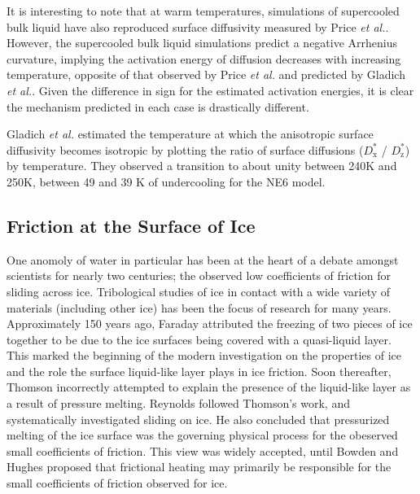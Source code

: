 It is interesting to note that at warm temperatures, simulations of
supercooled bulk liquid\cite{Picaud2006,Mahoney2001} have also reproduced surface
diffusivity measured by Price \textit{et al.}. However, the
supercooled bulk liquid simulations predict a negative Arrhenius
curvature, implying the activation energy of diffusion decreases with
increasing temperature, opposite of that observed by Price \textit{et
  al.} and predicted by Gladich \textit{et al.}. Given the difference
in sign for the estimated activation energies, it is clear the
mechanism predicted in each case is drastically different. 

Gladich \textit{et al.} estimated the temperature at which the
anisotropic surface diffusivity becomes isotropic by plotting the
ratio of surface diffusions ($D^{*}_\mathrm{x}$ / $D^{*}_\mathrm{z}$)
by temperature. They observed a transition to about unity between 240K
and 250K, between 49 and 39 K of undercooling for the NE6 model.




\subsection{Friction at the Surface of Ice}

One anomoly of water in particular has been at the heart of a debate
amongst scientists for nearly two centuries; the observed low
coefficients of friction for sliding across ice.  Tribological studies of
ice in contact with a wide variety of materials (including other ice)
has been the focus of research for many years.  Approximately 150
years ago, Faraday attributed the freezing of two pieces of ice
together to be due to the ice surfaces being covered with a
quasi-liquid layer.\cite{Faraday1859} This marked the beginning
of the modern investigation on the properties of ice and the role the
surface liquid-like layer plays in ice friction. Soon thereafter,
Thomson incorrectly attempted to explain the presence of the
liquid-like layer as a result of pressure melting.\cite{Thomson1859}
Reynolds followed Thomson's work, and systematically investigated
sliding on ice. He also concluded that pressurized melting of the ice
surface was the governing physical process for the obeserved small
coefficients of friction.\cite{Reynolds1901} This view was widely
accepted, until Bowden and Hughes proposed that frictional heating may
primarily be responsible for the small coefficients of friction
observed for ice.\cite{Bowden1939}

